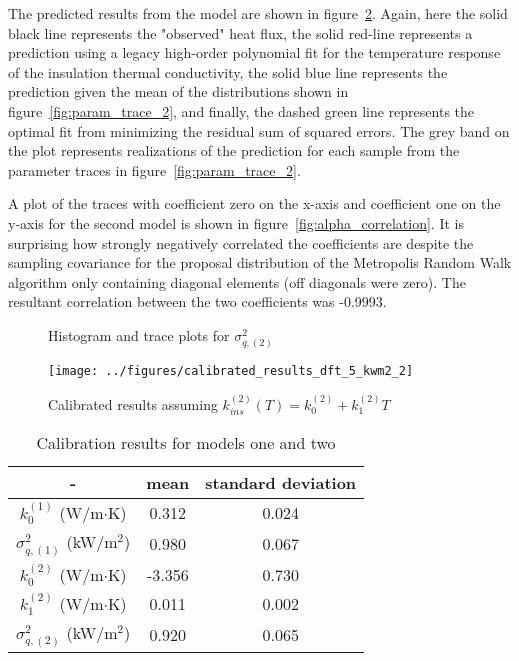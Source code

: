\documentclass[article]{proc}
\begin{document}
        The predicted results from the model are shown in figure~\ref{fig:cal_results_2}. Again, here the solid black line represents the "observed" heat flux, the solid red-line represents a prediction using a legacy high-order polynomial fit for the temperature response of the insulation thermal conductivity, the solid blue line represents the prediction given the mean of the distributions shown in figure~\ref{fig:param_trace_2}, and finally, the dashed green line represents the optimal fit from minimizing the residual sum of squared errors. The grey band on the plot represents realizations of the prediction for each sample from the parameter traces in figure~\ref{fig:param_trace_2}.

        A plot of the traces with coefficient zero on the x-axis and coefficient one on the y-axis for the second model is shown in figure~\ref{fig:alpha_correlation}. It is surprising how strongly negatively correlated the coefficients are despite the sampling covariance for the proposal distribution of the Metropolis Random Walk algorithm only containing diagonal elements (off diagonals were zero). The resultant correlation between the two coefficients was -0.9993. 

        \begin{figure}[!]
            \centering
            \qquad
            \caption{Histogram and trace plots for $\sigma_{q,(2)}^2$}
            \label{fig:sigma_trace_2}
        \end{figure}

        \begin{figure}[!]
            \centering
            \texttt{[image: ../figures/calibrated\_results\_dft\_5\_kwm2\_2]}
            \caption{Calibrated results assuming $k^{(2)}_{ins}(T) = k^{(2)}_0 + k^{(2)}_1 T$}
            \label{fig:cal_results_2}
        \end{figure}

        \begin{table}[!]
        \centering
        \caption{Calibration results for models one and two}
        \begin{tabular}{ccc}
            \hline
            - & mean & standard deviation \\
            \hline
            $k_0^{(1)}$ (W/m$\cdot$K)       & 0.312     & 0.024 \\
            $\sigma_{q, (1)}^2$ (kW/m$^2$)  & 0.980     & 0.067 \\
            \hline
            $k_0^{(2)}$ (W/m$\cdot$K)       & -3.356    & 0.730 \\
            $k_{1}^{(2)}$ (W/m$\cdot$K)     & 0.011     & 0.002 \\
            $\sigma_{q, (2)}^2$ (kW/m$^2$)  & 0.920     & 0.065 \\
            \hline
        \end{tabular}
        \label{tbl:cal_results}
        \end{table}
\end{document}

